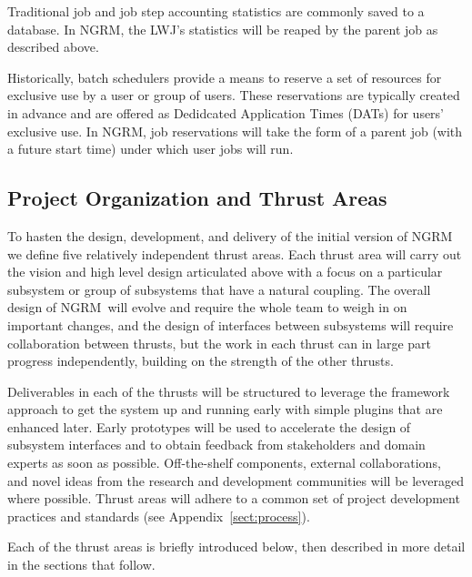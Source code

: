 \documentclass{article}
\newcommand{\ngrm}{NGRM}
\begin{document}
Traditional job and job step accounting statistics are commonly saved
to a database.  In NGRM, the LWJ's statistics will be reaped by the
parent job as described above.

Historically, batch schedulers provide a means to reserve a set of
resources for exclusive use by a user or group of users.  These
reservations are typically created in advance and are offered as
Dedidcated Application Times (DATs) for users' exclusive use.  In
NGRM, job reservations will take the form of a parent job (with a
future start time) under which user jobs will run.

\subsection{Project Organization and Thrust Areas}
\label{sect:projorg}
To hasten the design, development, and delivery of the initial version
of \ngrm\, we define five relatively independent thrust areas.
Each thrust area will carry out the vision and high level design articulated
above with a focus on a particular subsystem or group of subsystems that
have a natural coupling.  The overall design of \ngrm\ will evolve and
require the whole team to weigh in on important changes, and the design
of interfaces between subsystems will require collaboration between
thrusts, but the work in each thrust can in large part progress
independently, building on the strength of the other thrusts.

Deliverables in each of the thrusts will be structured 
to leverage the framework approach to get the system up and running
early with simple plugins that are enhanced later.
Early prototypes will be used to accelerate the design of subsystem
interfaces and to obtain feedback from stakeholders and domain experts
as soon as possible.
Off-the-shelf components, external collaborations, and novel ideas from
the research and development communities will be leveraged where possible.
Thrust areas will adhere to a common set of project development practices
and standards (see Appendix~\ref{sect:process}).

Each of the thrust areas is briefly introduced below, then described in
more detail in the sections that follow.
\end{document}
